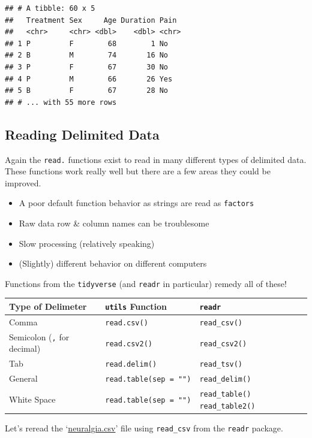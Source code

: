 \documentclass[
]{book}
\theoremstyle{definition}
\theoremstyle{definition}
\theoremstyle{definition}
\theoremstyle{remark}
\begin{document}
\begin{verbatim}
## # A tibble: 60 x 5
##   Treatment Sex     Age Duration Pain 
##   <chr>     <chr> <dbl>    <dbl> <chr>
## 1 P         F        68        1 No   
## 2 B         M        74       16 No   
## 3 P         F        67       30 No   
## 4 P         M        66       26 Yes  
## 5 B         F        67       28 No   
## # ... with 55 more rows
\end{verbatim}

\hypertarget{reading-delimited-data-1}{%
\subsection{Reading Delimited Data}\label{reading-delimited-data-1}}

Again the \texttt{read.} functions exist to read in many different types of delimited data. These functions work really well but there are a few areas they could be improved.

\begin{itemize}
\item
  A poor default function behavior as strings are read as \texttt{factors}
\item
  Raw data row \& column names can be troublesome
\item
  Slow processing (relatively speaking)
\item
  (Slightly) different behavior on different computers
\end{itemize}

Functions from the \texttt{tidyverse} (and \texttt{readr} in particular) remedy all of these!

\begin{longtable}[]{@{}lll@{}}
\toprule
Type of Delimeter & \texttt{utils} Function & \texttt{readr}\tabularnewline
\midrule
\endhead
Comma & \texttt{read.csv()} & \texttt{read\_csv()}\tabularnewline
Semicolon (\texttt{,} for decimal) & \texttt{read.csv2()} & \texttt{read\_csv2()}\tabularnewline
Tab & \texttt{read.delim()} & \texttt{read\_tsv()}\tabularnewline
General & \texttt{read.table(sep\ =\ "")} & \texttt{read\_delim()}\tabularnewline
White Space & \texttt{read.table(sep\ =\ "")} & \texttt{read\_table()} \texttt{read\_table2()}\tabularnewline
\bottomrule
\end{longtable}

Let's reread the `\href{https://www4.stat.ncsu.edu/~online/datasets/neuralgia.csv}{neuralgia.csv}' file using \texttt{read\_csv} from the \texttt{readr} package.
\end{document}
